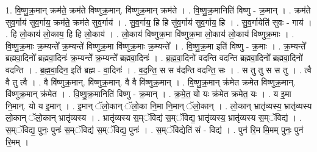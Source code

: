 \documentclass[17pt]{extarticle}
\begin{document}
1. वि॒ष्णु॒क्र॒मान् क्रम॑ते॒ क्रम॑ते विष्णुक्र॒मान्. वि॑ष्णुक्र॒मान् क्रम॑ते । . वि॒ष्णु॒क्र॒मानिति॑ विष्णु - क्र॒मान् । . क्रम॑ते सुव॒र्गाय॑ सुव॒र्गाय॒ क्रम॑ते॒ क्रम॑ते सुव॒र्गाय॑ । . सु॒व॒र्गाय॒ हि हि सु॑व॒र्गाय॑ सुव॒र्गाय॒ हि । . सु॒व॒र्गायेति॑ सुवः - गाय॑ । . हि लो॒काय॑ लो॒काय॒ हि हि लो॒काय॑ । . लो॒काय॑ विष्णुक्र॒मा वि॑ष्णुक्र॒मा लो॒काय॑ लो॒काय॑ विष्णुक्र॒माः । . वि॒ष्णु॒क्र॒माः क्र॒म्यन्ते᳚ क्र॒म्यन्ते॑ विष्णुक्र॒मा वि॑ष्णुक्र॒माः क्र॒म्यन्ते᳚ । . वि॒ष्णु॒क्र॒मा इति॑ विष्णु - क्र॒माः । . क्र॒म्यन्ते᳚ ब्रह्मवा॒दिनो᳚ ब्रह्मवा॒दिनः॑ क्र॒म्यन्ते᳚ क्र॒म्यन्ते᳚ ब्रह्मवा॒दिनः॑ । . ब्र॒ह्म॒वा॒दिनो॑ वदन्ति वदन्ति ब्रह्मवा॒दिनो᳚ ब्रह्मवा॒दिनो॑ वदन्ति । . ब्र॒ह्म॒वा॒दिन॒ इति॑ ब्रह्म - वा॒दिनः॑ । . व॒द॒न्ति॒ स स व॑दन्ति वदन्ति॒ सः । . स तु तु स स तु । . त्वै वै तु त्वै । . वै वि॑ष्णुक्र॒मान्. वि॑ष्णुक्र॒मान्. वै वै वि॑ष्णुक्र॒मान् । . वि॒ष्णु॒क्र॒मान् क्र॑मेत क्रमेत विष्णुक्र॒मान्. वि॑ष्णुक्र॒मान् क्र॑मेत । . वि॒ष्णु॒क्र॒मानिति॑ विष्णु - क्र॒मान् । . क्र॒मे॒त॒ यो यः क्र॑मेत क्रमेत॒ यः । . य इ॒मा नि॒मान्. यो य इ॒मान् । . इ॒मान् ॅलो॒कान् ॅलो॒का नि॒मा नि॒मान् ॅलो॒कान् । . लो॒कान् भ्रातृ॑व्यस्य॒ भ्रातृ॑व्यस्य लो॒कान् ॅलो॒कान् भ्रातृ॑व्यस्य । . भ्रातृ॑व्यस्य स॒म्ॅविद्य॑ स॒म्ॅविद्य॒ भ्रातृ॑व्यस्य॒ भ्रातृ॑व्यस्य स॒म्ॅविद्य॑ । . स॒म्ॅविद्य॒ पुनः॒ पुनः॑ स॒म्ॅविद्य॑ स॒म्ॅविद्य॒ पुनः॑ । . स॒म्ॅविद्येति॑ सं - विद्य॑ । . पुन॑ रि॒म मि॒मम् पुनः॒ पुन॑ रि॒मम् । \newline
\end{document}
